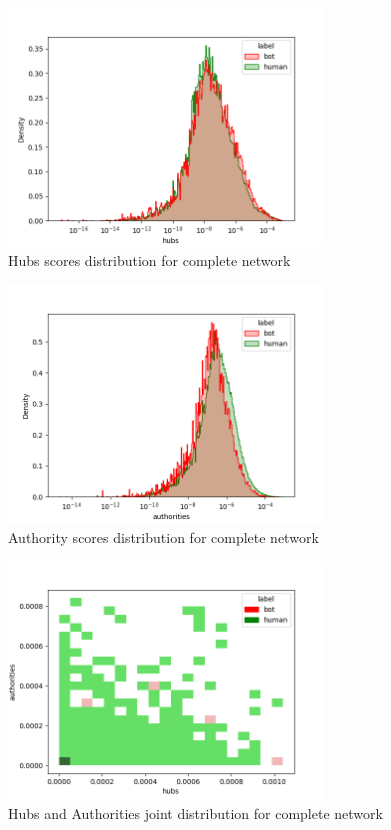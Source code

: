 \documentclass[12pt, a4paper]{article}
\begin{document}
\begin{itemize}
\begin{figure}[H]
                    \includegraphics[width=0.75\textwidth]{complete_hubs.png}
                    \caption{Hubs scores distribution for complete network}
                \end{figure}
                \begin{figure}[H]
                    \centering
                    \includegraphics[width=0.75\textwidth]{complete_authorities.png}
                    \caption{Authority scores distribution for complete network}
                \end{figure}
                \begin{figure}[H]
                    \centering
                    \includegraphics[width=0.75\textwidth]{complete_hubs&authorities.png}
                    \caption{Hubs and Authorities joint distribution for complete network}
                \end{figure}
		\end{itemize}
\end{document}

